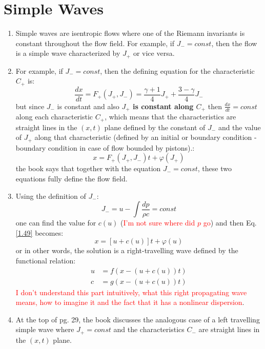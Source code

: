 ﻿\documentclass[11pt]{article}
\begin{document}
  \section{Simple Waves}
  \begin{enumerate}
    \item Simple waves are isentropic flows where one of the Riemann invariants is constant throughout the flow field. For example, if $J_- = const$, then the flow is a simple wave characterized by $J_+$ or vice versa.
    \item For example, if $J_- = const$, then the defining equation for the characteristic $C_+$ is:
    \begin{equation}
      \frac{dx}{dt} = F_+ (J_+, J_-) = \frac{\gamma + 1}{4} J_+ + \frac{3 - \gamma}{4} J_-
    \end{equation}
    but since $J_-$ is constant and also \textbf{$J_+$ is constant along $C_+$} then $\frac{dx}{dt} = const$ along each characteristic $C_+$, which means that the characteristics are straight lines in the $(x,t)$ plane defined by the constant of $J_-$ and the value of $J_+$ along that characteristic (defined by an initial or boundary condition - boundary condition in case of flow bounded by pistons).:
    \begin{equation}
      x = F_+ (J_+, J_-) t + \varphi(J_+) \label{1.49}
    \end{equation}
    the book says that together with the equation $J_- = const$, these two equations fully define the flow field.
    \item Using the definition of $J_-$:
    \begin{equation}
      J_- = u - \int \frac{dp}{\rho c} = const 
    \end{equation}
    one can find the value for $c(u)$ (\textcolor{red}{I'm not sure where did $p$ go}) and then Eq. \ref{1.49} becomes:
    \begin{equation}
      x = \left[ u + c(u) \right] t + \varphi(u)
    \end{equation}
    or in other words, the solution is a right-travelling wave defined by the functional relation:
    \begin{align}
      u &= f \left( x - (u + c(u)) t \right) \\
      c &= g \left( x - (u + c(u)) t \right)
    \end{align}
    \textcolor{red}{I don't understand this part intuitively, what this right propagating wave means, how to imagine it and the fact that it has a nonlinear dispersion}.
    \item At the top of pg. 29, the book discusses the analogous case of a left travelling simple wave where $J_+ = const$ and the characteristics $C_-$ are straight lines in the $(x,t)$ plane.
  \end{enumerate}
\end{document}
